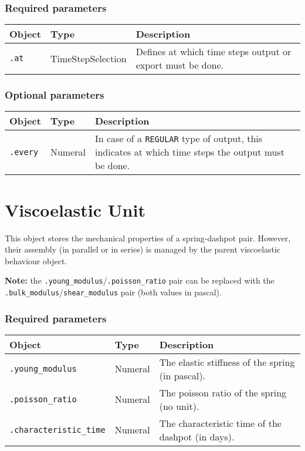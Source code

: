 \documentclass[10pt]{article}
\begin{document}
\subsubsection*{Required parameters}

\begin{tabularx}{\textwidth}{llX}
\hline 
Object & Type & Description \\ 
\hline 
\verb+.at+ & TimeStepSelection & Defines at which time steps output or export must be done. \\ 
\hline 
\end{tabularx}

\subsubsection*{Optional parameters}

\begin{tabularx}{\textwidth}{llX}
\hline 
Object & Type & Description \\ 
\hline 
\verb+.every+ & Numeral & In case of a \verb+REGULAR+ type of output, this indicates at which time steps the output must be done.\\
\hline 
\end{tabularx}








\section{Viscoelastic Unit}

This object stores the mechanical properties of a spring-dashpot pair. However, their assembly (in parallel or in series) is managed by the parent viscoelastic behaviour object.

\textbf{Note:} the \verb+.young_modulus+/\verb+.poisson_ratio+ pair can be replaced with the \verb+.bulk_modulus+/\verb+shear_modulus+ pair (both values in pascal).

\subsubsection*{Required parameters}

\begin{tabularx}{\textwidth}{llX}
\hline 
Object & Type & Description \\ 
\hline 
\verb+.young_modulus+ & Numeral & The elastic stiffness of the spring (in pascal).\\
\verb+.poisson_ratio+ & Numeral & The poisson ratio of the spring (no unit).\\
\verb+.characteristic_time+ & Numeral & The characteristic time of the dashpot (in days).\\
\hline 
\end{tabularx}
\end{document}

